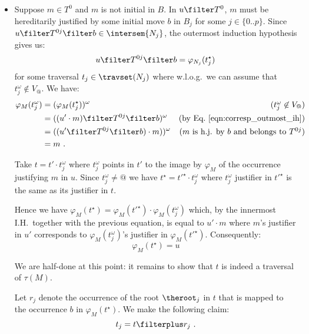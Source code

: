 \begin{itemize}[$\bullet$]
\begin{enumerate}
\begin{itemize}
    \item Suppose $m\in T^0$ and $m$ is not initial in $B$. In $u \filter T^0$, $m$ must be hereditarily justified by some initial move $b$ in $B_j$ for some $j\in \{0..p\}$. Since $u \filter T^{0j} \filter b \in \intersem{N_j}$, the outermost induction hypothesis gives us:
        \begin{equation}
        u \filter T^{0j} \filter b = \varphi_{N_j}(t_j^\star)  \label{eqn:corresp_outmost_ih}
        \end{equation}
        for some traversal $t_j \in \travset(N_j)$ where w.l.o.g.\ we can assume that $t_j^\omega \not\in V_@$. We have:
        \begin{align*}
            \varphi_M (t_j^\omega) &= (\varphi_M (t_j^\star))^\omega & \mbox{($t_j^\omega \not\in V_@$)}\\
                                   &= ((u' \cdot m) \filter T^{0j}\filter b)^\omega & \mbox{(by Eq.\ \ref{eqn:corresp_outmost_ih})}\\
                                   &= ((u' \filter T^{0j}\filter b) \cdot m))^\omega & \mbox{($m$ is h.j. by $b$ and belongs to $T^{0j}$)}\\
                                   &= m \ .
        \end{align*}

        Take $t = t'\cdot t_j^\omega$ where $t_j^\omega$ points in $t'$ to the image by $\varphi_M$ of the occurrence justifying $m$ in $u$. Since $t_j^\omega \neq @$ we have  $t^\star = t'^\star \cdot t_j^\omega$ where $t_j^\omega$ justifier in $t'^\star$ is the same as its justifier in $t$.
 

        Hence we have $\varphi_{M}(t^\star) =  \varphi_{M}(t'^\star)  \cdot \varphi_{M}(t_j^\omega)$ which, by the innermost I.H.\ together with the previous equation, is equal to $u' \cdot m$ where $m$'s justifier in $u'$ corresponds to $\varphi_{M}(t_j^\omega)$'s justifier in $\varphi_{M}(t'^\star)$. Consequently:
        \begin{equation}
                \varphi_M(t^\star) =  u  \label{eqn:corresp_phi_t_minu_at_eq_u}
        \end{equation}
\smallskip

        We are half-done at this point: it remains to show that $t$ is indeed a traversal of $\tau(M)$.

        Let $r_j$ denote the occurrence of the root
        $\theroot_j$ in $t$ that is mapped to the
        occurrence $b$ in $\varphi_{M}(t^\star)$. We make the following claim:
        \begin{equation}
            t_j = t \filterplus r_j \ . \label{equ:claim_tj}
        \end{equation}


\end{itemize}
\end{enumerate}
\end{itemize}
